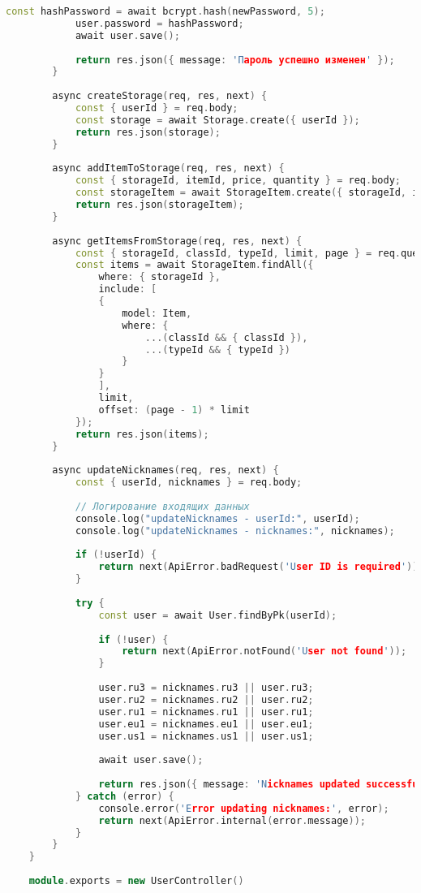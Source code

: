 \begin{lstlisting}[language=C++]
			const hashPassword = await bcrypt.hash(newPassword, 5);
			user.password = hashPassword;
			await user.save();
			
			return res.json({ message: 'Пароль успешно изменен' });
		}
		
		async createStorage(req, res, next) {
			const { userId } = req.body;
			const storage = await Storage.create({ userId });
			return res.json(storage);
		}
		
		async addItemToStorage(req, res, next) {
			const { storageId, itemId, price, quantity } = req.body;
			const storageItem = await StorageItem.create({ storageId, itemId, price, quantity });
			return res.json(storageItem);
		}
		
		async getItemsFromStorage(req, res, next) {
			const { storageId, classId, typeId, limit, page } = req.query;
			const items = await StorageItem.findAll({
				where: { storageId },
				include: [
				{
					model: Item,
					where: {
						...(classId && { classId }),
						...(typeId && { typeId })
					}
				}
				],
				limit,
				offset: (page - 1) * limit
			});
			return res.json(items);
		}
		
		async updateNicknames(req, res, next) {
			const { userId, nicknames } = req.body;
			
			// Логирование входящих данных
			console.log("updateNicknames - userId:", userId);
			console.log("updateNicknames - nicknames:", nicknames);
			
			if (!userId) {
				return next(ApiError.badRequest('User ID is required'));
			}
			
			try {
				const user = await User.findByPk(userId);
				
				if (!user) {
					return next(ApiError.notFound('User not found'));
				}
				
				user.ru3 = nicknames.ru3 || user.ru3;
				user.ru2 = nicknames.ru2 || user.ru2;
				user.ru1 = nicknames.ru1 || user.ru1;
				user.eu1 = nicknames.eu1 || user.eu1;
				user.us1 = nicknames.us1 || user.us1;
				
				await user.save();
				
				return res.json({ message: 'Nicknames updated successfully' });
			} catch (error) {
				console.error('Error updating nicknames:', error);
				return next(ApiError.internal(error.message));
			}
		}
	}
	
	module.exports = new UserController()
\end{lstlisting}

